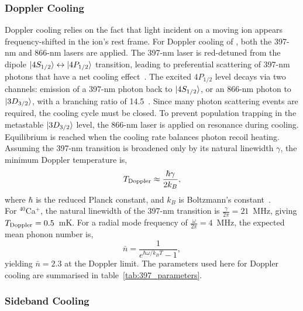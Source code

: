 \subsubsection{Doppler Cooling}

    Doppler cooling relies on the fact that light incident on a moving ion 
    appears frequency-shifted in the ion's rest frame. For Doppler cooling
    of \ca, both the 397-nm and 866-nm lasers are applied. The 397-nm laser is red-detuned from the dipole $\ket{4S_{1/2}}\leftrightarrow\ket{4P_{1/2}}$ transition, leading to preferential
    scattering of 397-nm photons that have a net cooling effect~\cite{wineland1979laser}. The excited $4P_{1/2}$ level decays via two channels: emission of a 397-nm photon back to $\ket{4S_{1/2}}$, or an 866-nm photon to $\ket{3D_{3/2}}$, with a branching
    ratio of 14.5~\cite{ramm2013precision}. Since many photon scattering events are required, the cooling cycle must be closed. To prevent population trapping in the metastable $\ket{3D_{3/2}}$ level, the 866-nm laser is applied on resonance during cooling.\\
    Equilibrium
    is reached when the cooling rate balances
    photon recoil heating. Assuming the 397-nm transition is broadened only by its natural linewidth $\gamma$, 
    the minimum Doppler temperature is,
    \begin{equation}
    T_{\rm Doppler} \approx \frac{\hbar\gamma}{2k_B},
    \end{equation}
    where $\hbar$ is the reduced Planck constant, and $k_B$ is Boltzmann's constant~\cite{wineland1979laser}.\\
     For
    $^{40}$Ca$^+$, the natural linewidth of the 397-nm transition is $\frac{\gamma}{2\pi} =
    21$~\unit{\MHz}\cite{morton2003atomic}, giving $T_{\rm Doppler} = 0.5$~\unit{\milli\kelvin}. For a radial mode frequency of $\frac{\omega}{2\pi} = 4$~\unit{\MHz}, the expected mean phonon number is,
    \begin{equation}
        \bar{n} = \frac{1}{e^{\hbar\omega/k_B T}-1},
    \end{equation}
    yielding $\bar{n} = 2.3$ at the Doppler limit.
    The parameters used here for Doppler cooling are summarised in table~\ref{tab:397_parameters}. \\

\subsubsection{Sideband Cooling}

